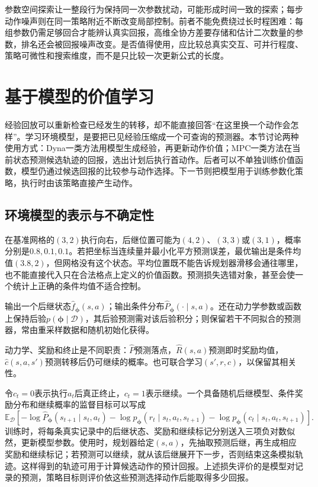 参数空间探索让一整段行为保持同一次参数扰动，可能形成时间一致的探索；每步动作噪声则在同一策略附近不断改变局部控制。前者不能免费绕过长时程困难：每组参数仍需足够回合才能辨认真实回报，高维全协方差要存储和估计二次数量的参数，排名还会被回报噪声改变。是否值得使用，应比较总真实交互、可并行程度、策略可微性和搜索维度，而不是只比较一次更新公式的长度。

\section{基于模型的价值学习}
\label{sec:rl-learning-model-value}

经验回放可以重新检查已经发生的转移，却不能直接回答“在这里换一个动作会怎样”。学习环境模型，是要把已见经验压缩成一个可查询的预测器。本节讨论两种使用方式：Dyna一类方法用模型生成经验，再更新动作价值；MPC一类方法在当前状态预测候选轨迹的回报，选出计划后执行首动作。后者可以不单独训练价值函数，模型仍通过候选回报的比较参与动作选择。下一节则把模型用于训练参数化策略，执行时由该策略直接产生动作。

\subsection{环境模型的表示与不确定性}
\label{sec:rl-learning-model-representation}

在基准网格的$(3,2)$执行向右，后继位置可能为$(4,2)$、$(3,3)$或$(3,1)$，概率分别是$0.8,0.1,0.1$。若把坐标当连续量并最小化平方预测误差，最优输出是条件均值$(3.8,2)$，但网格没有这个状态。平均位置既不能告诉规划器滑移会通往哪里，也不能直接代入只在合法格点上定义的价值函数。预测损失选错对象，甚至会使一个统计上正确的条件均值不适合控制。

\begin{definition}[学习模型的预测对象]
  \label{def:rl-learning-learned-model}
  输出一个后继状态$\widehat f_{\bm\phi}(s,a)$；输出条件分布$\widehat P_{\bm\phi}(\cdot\mid s,a)$。还在动力学参数或函数上保持后验$p(\bm\phi\mid\mathcal D)$，其后验预测需对该后验积分；则保留若干不同拟合的预测器，常由重采样数据和随机初始化获得。

  动力学、奖励和终止是不同职责：$\widehat P$预测落点，$\widehat R(s,a)$预测即时奖励均值，$\widehat c(s,a,s')$预测转移后仍可继续的概率。也可联合学习$(s',r,c)$，以保留其相关性。
\end{definition}

令$c_t=0$表示执行$a_t$后真正终止，$c_t=1$表示继续。一个具备随机后继模型、条件奖励分布和继续概率的监督目标可以写成
\[
  \mathbb E_{\mathcal D}\!\left[
    -\log\widehat P_{\bm\phi}(s_{t+1}\mid s_t,a_t)
    -\log p_{\bm\phi}(r_t\mid s_t,a_t,s_{t+1})
    -\log p_{\bm\phi}(c_t\mid s_t,a_t,s_{t+1})
  \right].
\]
训练时，将每条真实记录中的后继状态、奖励和继续标记分别送入三项负对数似然，更新模型参数。使用时，规划器给定$(s,a)$，先抽取预测后继，再生成相应奖励和继续标记；若预测可以继续，就从该后继展开下一步，否则结束这条模拟轨迹。这样得到的轨迹可用于计算候选动作的预计回报。上述损失评价的是模型对记录的预测，策略目标则评价依这些预测选择动作后能取得多少回报。


